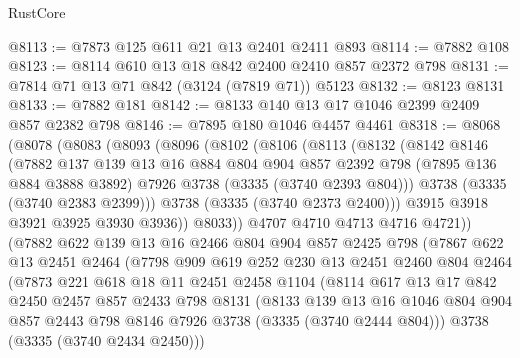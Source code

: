 \begin{lexlean}{RustCore}
\begin{coremodule}
@8113 := @7873 @125 @611 @21 @13 @2401 @2411 @893
@8114 := @7882 @108
@8123 := @8114 @610 @13 @18 @842 @2400 @2410 @857 @2372 @798
@8131 := @7814 @71 @13 @71 @842 (@3124 (@7819 @71)) @5123
@8132 := @8123 @8131
@8133 := @7882 @181
@8142 := @8133 @140 @13 @17 @1046 @2399 @2409 @857 @2382 @798
@8146 := @7895 @180 @1046 @4457 @4461
@8318 := @8068
    (@8078
      (@8083
        (@8093
          (@8096
            (@8102
              (@8106
                (@8113
                  (@8132
                    (@8142
                      @8146
                      (@7882
                        @137
                        @139
                        @13
                        @16
                        @884
                        @804
                        @904
                        @857
                        @2392
                        @798
                        (@7895 @136 @884 @3888 @3892)
                        @7926
                        @3738
                        (@3335 (@3740 @2393 @804)))
                      @3738
                      (@3335 (@3740 @2383 @2399)))
                    @3738
                    (@3335 (@3740 @2373 @2400)))
                  @3915
                  @3918
                  @3921
                  @3925
                  @3930
                  @3936))
              @8033))
          @4707
          @4710
          @4713
          @4716
          @4721))
      (@7882
        @622
        @139
        @13
        @16
        @2466
        @804
        @904
        @857
        @2425
        @798
        (@7867
          @622
          @13
          @2451
          @2464
          (@7798
            @909
            @619
            @252
            @230
            @13
            @2451
            @2460
            @804
            @2464
            (@7873
              @221
              @618
              @18
              @11
              @2451
              @2458
              @1104
              (@8114
                @617
                @13
                @17
                @842
                @2450
                @2457
                @857
                @2433
                @798
                @8131
                (@8133
                  @139
                  @13
                  @16
                  @1046
                  @804
                  @904
                  @857
                  @2443
                  @798
                  @8146
                  @7926
                  @3738
                  (@3335 (@3740 @2444 @804)))
                @3738
                (@3335 (@3740 @2434 @2450)))

\end{coremodule}
\end{lexlean}
